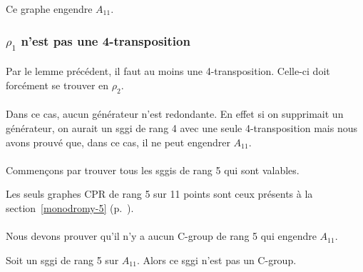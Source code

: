 \begin{lemma}
  Ce graphe engendre $A_{11}$.
\end{lemma}

\subsubsection{$\rho_1$ n'est pas une 4-transposition}

\paragraph{}
Par le lemme précédent, il faut au moins une 4-transposition. Celle-ci doit forcément se trouver en $\rho_2$.

\paragraph{}
Dans ce cas, aucun générateur n'est redondante. En effet si on supprimait un générateur, on aurait un sggi de rang 4 avec une seule 4-transposition mais nous avons prouvé que, dans ce cas, il ne peut engendrer $A_11$.

\paragraph{}
Commençons par trouver tous les sggis de rang 5 qui sont valables.

\begin{theorem}
  Les seuls graphes CPR de rang 5 sur 11 points sont ceux présents à la section~\ref{monodromy-5} (p.~\pageref{monodromy-5}).

\end{theorem}

\paragraph{}
Nous devons prouver qu'il n'y a aucun C-group de rang 5 qui engendre $A_{11}$.

\begin{theorem}
  Soit un sggi de rang 5 sur $A_{11}$. Alors ce sggi n'est pas un C-group.
\end{theorem}

